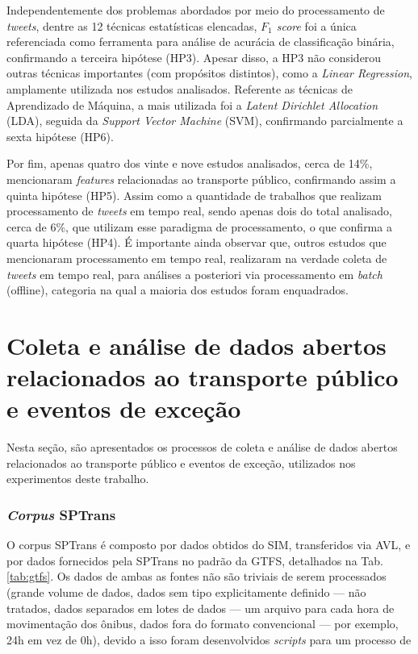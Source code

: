 \documentclass[
	12pt,				%
	oneside,			%
	a4paper,			%
	english,			%
	brazil				%
	]{abntex2ppgsi}
\begin{document}
{{Independentemente dos problemas abordados por meio do processamento de \textit{tweets}, dentre as 12 técnicas estatísticas elencadas, \textit{${F_1}$ score} foi a única referenciada como ferramenta para análise de acurácia de classificação binária, confirmando a terceira hipótese (HP3). Apesar disso, a HP3 não considerou outras técnicas importantes (com propósitos distintos), como a \textit{Linear Regression}, amplamente utilizada nos estudos analisados. Referente as técnicas de Aprendizado de Máquina, a mais utilizada foi a \textit{Latent Dirichlet Allocation} (LDA), seguida da \textit{Support Vector Machine} (SVM), confirmando parcialmente a sexta hipótese (HP6).

Por fim, apenas quatro dos vinte e nove estudos analisados, cerca de 14\%, mencionaram \textit{features} relacionadas ao transporte público, confirmando assim a quinta hipótese (HP5). Assim como a quantidade de trabalhos que realizam processamento de \textit{tweets} em tempo real, sendo apenas dois do total analisado, cerca de 6\%, que utilizam esse paradigma de processamento, o que confirma a quarta hipótese (HP4). É importante ainda observar que, outros estudos que mencionaram processamento em tempo real, realizaram na verdade coleta de \textit{tweets} em tempo real, para análises a posteriori via processamento em \textit{batch} (offline), categoria na qual a maioria dos estudos foram enquadrados.

\chapter{Coleta e análise de dados abertos relacionados ao transporte público e eventos de exceção}
\label{dataSet}

Nesta seção, são apresentados os processos de coleta e análise de dados abertos relacionados ao transporte público e eventos de exceção, utilizados nos experimentos deste trabalho.

\subsection{\textit{Corpus} SPTrans}
\label{CorpusSPTrans}

O corpus SPTrans é composto por dados obtidos do SIM, transferidos via AVL, e por dados fornecidos pela SPTrans no padrão da GTFS, detalhados na Tab. \ref{tab:gtfs}. Os dados de ambas as fontes não são triviais de serem processados (grande volume de dados, dados sem tipo explicitamente definido --- não tratados, dados separados em lotes de dados --- um arquivo para cada hora de movimentação dos ônibus, dados fora do formato convencional --- por exemplo, 24h em vez de 0h), devido a isso foram desenvolvidos \textit{scripts} para um processo de  

}}
\end{document}
